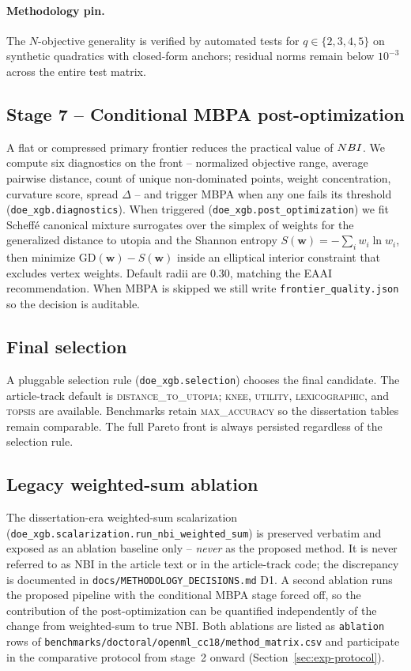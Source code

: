 \paragraph{Methodology pin.} The $N$-objective generality is
verified by automated tests for $q\in\{2,3,4,5\}$ on synthetic
quadratics with closed-form anchors; residual norms remain below
$10^{-3}$ across the entire test matrix.

\subsection{Stage 7 -- Conditional MBPA post-optimization}
\label{sec:method-mbpa}
A flat or compressed primary frontier reduces the practical value of
$NBI$. We compute six diagnostics on the front -- normalized
objective range, average pairwise distance, count of unique
non-dominated points, weight concentration, curvature score, spread
$\Delta$ -- and trigger MBPA when any one fails its threshold
(\texttt{doe\_xgb.diagnostics}). When triggered
(\texttt{doe\_xgb.post\_optimization}) we fit Scheff\'{e} canonical
mixture surrogates over the simplex of weights for the
generalized distance to utopia
\citep[Eq.~29]{pereira2025eaai} and the Shannon entropy
$S(\bm w) = -\sum_i w_i \ln w_i$, then minimize $\mathrm{GD}(\bm w) -
S(\bm w)$ inside an elliptical interior constraint that excludes
vertex weights. Default radii are $0.30$, matching the EAAI
recommendation. When MBPA is skipped we still write
\texttt{frontier\_quality.json} so the decision is auditable.

\subsection{Final selection}
\label{sec:method-selection}
A pluggable selection rule (\texttt{doe\_xgb.selection}) chooses the
final candidate. The article-track default is
\textsc{distance\_to\_utopia}; \textsc{knee},
\textsc{utility}, \textsc{lexicographic}, and \textsc{topsis} are
available. Benchmarks retain \textsc{max\_accuracy} so the
dissertation tables remain comparable. The full Pareto front is
always persisted regardless of the selection rule.

\subsection{Legacy weighted-sum ablation}
\label{sec:method-legacy}
The dissertation-era weighted-sum scalarization
(\texttt{doe\_xgb.scalarization.run\_nbi\_weighted\_sum}) is preserved
verbatim and exposed as an ablation baseline only -- \emph{never} as
the proposed method. It is never referred to as NBI in the article
text or in the article-track code; the discrepancy is documented in
\texttt{docs/METHODOLOGY\_DECISIONS.md} D1. A second ablation runs
the proposed pipeline with the conditional MBPA stage forced off, so
the contribution of the post-optimization can be quantified
independently of the change from weighted-sum to true NBI. Both
ablations are listed as \texttt{ablation} rows of
\texttt{benchmarks/doctoral/openml\_cc18/method\_matrix.csv} and
participate in the comparative protocol from stage~2 onward
(Section~\ref{sec:exp-protocol}).

